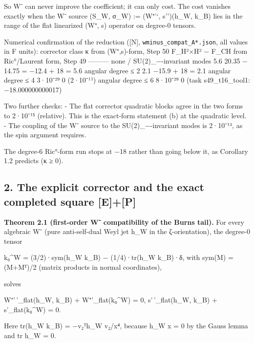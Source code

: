 \documentclass[
  10pt,
]{report}
\begin{document}
So W⁻ can never improve the coefficient; it can only cost. The cost
vanishes exactly when the W⁻ source (S\_W, σ\_W) := (W⁺'`, s'')(h\_W,
k\_B) lies in the range of the flat linearized (W⁺, s) operator on
degree-0 tensors.

Numerical confirmation of the reduction ({[}N{]},
\texttt{wminus\_compat\_A*.json}, all values in F units): \textbar{}
corrector class \textbar{} κ from (W⁺,s)-form, Step 50 \textbar{}
F\_H²×H² − F\_CH from Ric°/Laurent form, Step 49 \textbar{}
\textbar---\textbar---\textbar---\textbar{} \textbar{} none /
SU(2)\_−-invariant modes \textbar{} 5.6 \textbar{} 20.35 − 14.75 = −12.4
+ 18 = 5.6 \textbar{} \textbar{} angular degree ≤ 2 \textbar{} 2.1
\textbar{} −15.9 + 18 = 2.1 \textbar{} \textbar{} angular degree ≤ 4
\textbar{} 3·10⁻²⁹ \textbar{} 0 (2·10⁻¹¹) \textbar{} \textbar{} angular
degree ≤ 6 \textbar{} 8·10⁻²⁹ \textbar{} 0 (task s49\_t16\_tool1:
−18.000000000017) \textbar{}

Two further checks: - The flat corrector quadratic blocks agree in the
two forms to 2·10⁻¹⁵ (relative). This is the exact-form statement (b) at
the quadratic level. - The coupling of the W⁻ source to the
SU(2)\_−-invariant modes is 2·10⁻¹³, as the spin argument requires.

The degree-6 Ric°-form run stops at −18 rather than going below it, as
Corollary 1.2 predicts (κ ≥ 0).

\hypertarget{the-explicit-corrector-and-the-exact-completed-square-ep}{%
\subsection{2. The explicit corrector and the exact completed square
{[}E{]}+{[}P{]}}\label{the-explicit-corrector-and-the-exact-completed-square-ep}}

\textbf{Theorem 2.1 (first-order W⁻ compatibility of the Burns tail).}
For every algebraic W⁻ (pure anti-self-dual Weyl jet h\_W in the
ζ-orientation), the degree-0 tensor

k₀\^{}W = (3/2)·sym(h\_W k\_B) − (1/4)·tr(h\_W k\_B)·δ, with sym(M) =
(M+Mᵀ)/2 (matrix products in normal coordinates),

solves

W⁺'\,'\_flat(h\_W, k\_B) + W⁺'\_flat(k₀\^{}W) = 0, s'\,'\_flat(h\_W,
k\_B) + s'\_flat(k₀\^{}W) = 0.

Here tr(h\_W k\_B) = −v₂ᵀh\_W v₂/\textbar x\textbar⁴, because h\_W x = 0
by the Gauss lemma and tr h\_W = 0.
\end{document}
